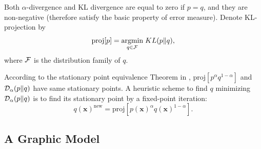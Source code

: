 \documentclass[conference,onecolumn]{IEEEtran}
\begin{document}
Both $\alpha$-divergence and KL divergence are equal to zero if $p=q$, and they are non-negative (therefore satisfy the basic property of error measure).
Denote KL-projection by
\begin{equation}
  \text{proj}[p] = \underset{q \in \mathcal{F}}{\operatorname{argmin}}\; KL(p\|q),
\end{equation}
where $\mathcal{F}$ is the distribution family of $q$.

According to the stationary point equivalence Theorem in \cite{divergence-measures-and-message-passing}, $\text{proj}[p^{\alpha}q^{1- \alpha}]$ and $\mathcal{D}_{\alpha}(p\|q)$ have same stationary points. A heuristic scheme to find $q$ minimizing $\mathcal{D}_{\alpha}(p\|q)$ is to find its stationary point by a fixed-point iteration:
\begin{equation}\label{eq:fixed-point-iter}
  q(\bm{x})^{\text{new}}  = \text{proj}[p(\bm{x})^{\alpha}q(\bm{x})^{1-\alpha}].
\end{equation}

\subsection{A Graphic Model}
\end{document}
